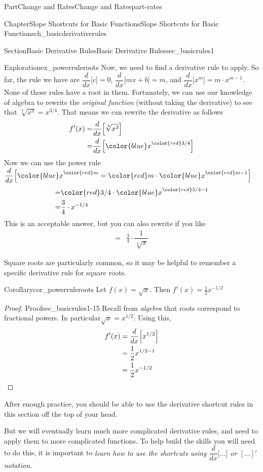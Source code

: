 \documentclass{tufte-book}
\numberwithin{equation}{chapter}
\newcommand{\qedhere}{\relax}
\newcommand{\ddx}[1]{ \dfrac{d}{dx} \Big[ #1 \Big]  }
\newcommand{\amp}{&}
\begin{document}
\begin{partptx}{Part}{Change and Rates}{}{Change and Rates}{}{}{part-rates}
\begin{chapterptx}{Chapter}{Slope Shortcuts for Basic Functions}{}{Slope Shortcuts for Basic Functions}{}{}{ch_basicderivativerules}
\begin{sectionptx}{Section}{Basic Derivative Rules}{}{Basic Derivative Rules}{}{}{sec_basicrules1}
\begin{exploration}{Exploration}{}{ex_powerruleroots}
Now, we need to find a derivative rule to apply. So far, the rule we have are \(\ddx{c} = 0\), \(\ddx{mx+b} = m\), and \(\ddx{x^m} = m\cdot x^{m-1}\). None of those rules have a root in them.  Fortunately, we can use our knowledge of algebra to rewrite the \emph{original function} (without taking the derivative) to see that \(\sqrt[4]{x^3} = x^{3/4}\).  That means we can rewrite the derivative as follows%
\begin{align*}
f'(x) = \amp \dfrac{d}{dx}\Big[  \sqrt[4]{x^3} \Big] \\
=  \amp \dfrac{d}{dx}\Big[  {\color{blue} x}^{\color{red} 3/4}  \Big]
\end{align*}
Now we can use the power rule \(\dfrac{d}{dx}\Big[   {\color{blue} x}^{\color{red} m}= {\color{red} m}\cdot {\color{blue} x}^{{\color{red} m}-1} \Big] \)%
\begin{align*}
= \amp {\color{red} 3/4} \cdot {\color{blue} x}^{{\color{red} 3/4}-1} \\
= \amp \frac{3}{4} \cdot x^{-1/4} 
\end{align*}
This is an acceptable answer, but you can also rewrite if you like%
\begin{align*}
= \amp \frac{3}{4} \cdot \dfrac{1}{\sqrt[4]{x}} 
\end{align*}
%
\end{exploration}%
Square roots are particularly common, so it may be helpful to remember a specific derivative rule for square roots.%
\begin{corollary}{Corollary}{}{}{cor_powerruleroots}%
Let \(f(x) = \sqrt{x}\).  Then \(f'(x) = \frac{1}{2} x^{-1/2}\)%
\end{corollary}
\begin{proof}{Proof}{}{sec_basicrules1-15}
Recall from \emph{algebra} that roots correspond to fractional powers.  In particular\(\sqrt{x} = x^{1/2}\). Using this,%
\begin{align*}
f'(x) \amp = \ddx{x^{1/2}} \\
\amp = \frac{1}{2} x^{1/2 - 1}\\
\amp = \frac{1}{2} x^{-1/2}\qedhere
\end{align*}
%
\end{proof}
After enough practice, you should be able to use the derivative shortcut rules in this section off the top of your head.%
\par
But we will eventually learn much more complicated derivative rules, and need to apply them to more complicated functions.  To help build the skills you will need to do this, it is important to \emph{learn how to use the shortcuts using \(\dfrac{d}{dx}\Big[\dots\Big]\) or \([ \dots ]'\) notation}.%

\end{sectionptx}
\end{chapterptx}
\end{partptx}
\end{document}
